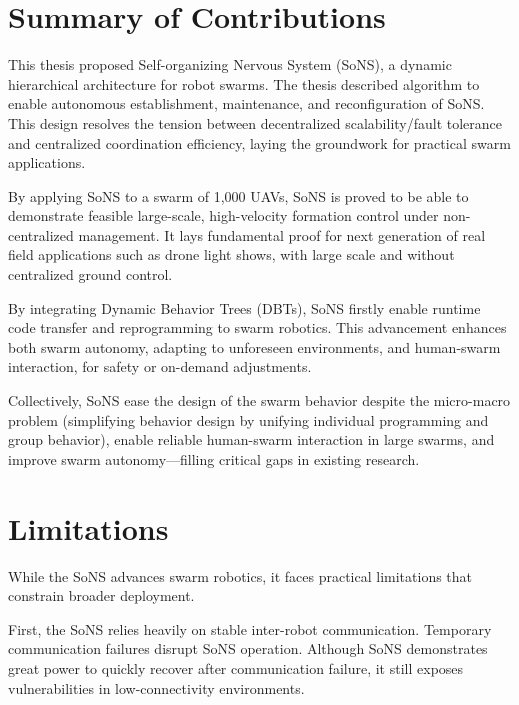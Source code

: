 \section{Summary of Contributions}

This thesis proposed Self-organizing Nervous System (SoNS), a dynamic hierarchical architecture for robot swarms.
The thesis described algorithm to enable autonomous establishment, maintenance, and reconfiguration of SoNS.
This design resolves the tension between decentralized scalability/fault tolerance and centralized coordination efficiency, laying the groundwork for practical swarm applications.

By applying SoNS to a swarm of 1,000 UAVs, SoNS is proved to be able to demonstrate feasible large-scale, high-velocity formation control under non-centralized management.
It lays fundamental proof for next generation of real field applications such as drone light shows, with large scale and without centralized ground control.

By integrating Dynamic Behavior Trees (DBTs), SoNS firstly enable runtime code transfer and reprogramming to swarm robotics.
This advancement enhances both swarm autonomy, adapting to unforeseen environments, and human-swarm interaction, for safety or on-demand adjustments.

Collectively, SoNS ease the design of the swarm behavior despite the micro-macro problem (simplifying behavior design by unifying individual programming and group behavior), enable reliable human-swarm interaction in large swarms, and improve swarm autonomy—filling critical gaps in existing research.


\section{Limitations}

While the SoNS advances swarm robotics, it faces practical limitations that constrain broader deployment.

First, the SoNS relies heavily on stable inter-robot communication.
Temporary communication failures disrupt SoNS operation.
Although SoNS demonstrates great power to quickly recover after communication failure, it still exposes vulnerabilities in low-connectivity environments.

